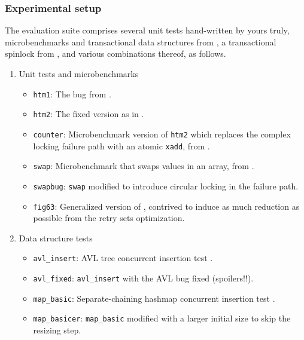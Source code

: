 \subsubsection{Experimental setup}
\label{sec:tm-eval-exp-setup}

The evaluation suite comprises several unit tests hand-written by yours truly,
microbenchmarks and transactional data structures from \cite{tm-benchmark-cmu},
a transactional spinlock from \cite{spinlock-rtm-github},
and various combinations thereof,
as follows.


\begin{enumerate}
	\item Unit tests and microbenchmarks
	\begin{itemize}
		\item {\tt htm1}: The bug from .
		\item {\tt htm2}: The fixed version as in .
		\item {\tt counter}: Microbenchmark version of {\tt htm2} which replaces the complex locking failure path with an atomic {\tt xadd}, from \cite{tm-benchmark-cmu}.
		\item {\tt swap}: Microbenchmark that swaps values in an array, from \cite{tm-benchmark-cmu}.
		\item {\tt swapbug}: {\tt swap} modified to introduce circular locking in the failure path. %
		\item {\tt fig63}: Generalized version of ,
			contrived to induce as much reduction as possible from the retry sets optimization.
	\end{itemize}
	\item Data structure tests
	\begin{itemize}
		\item {\tt avl\_insert}: AVL tree concurrent insertion test \cite{tm-benchmark-cmu}.
		\item {\tt avl\_fixed}: {\tt avl\_insert} with the AVL bug fixed (spoilers!!).
		\item {\tt map\_basic}: Separate-chaining hashmap concurrent insertion test \cite{tm-benchmark-cmu}.
		\item {\tt map\_basicer}: {\tt map\_basic} modified with a larger initial size to skip the resizing step.

\end{itemize}
\end{enumerate}
